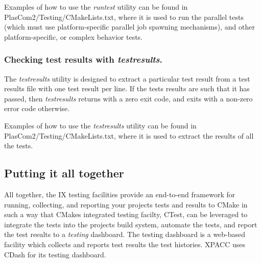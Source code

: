 Examples of how to use the {\itshape runtest} utility can be found in {\ttfamily Plas\+Com2/\+Testing/\+C\+Make\+Lists.\+txt}, where it is used to run the parallel tests (which must use platform-\/specific parallel job spawning mechanisms), and other platform-\/specific, or complex behavior tests.

\subsubsection*{Checking test results with {\itshape testresults}.}

The {\itshape testresults} utility is designed to extract a particular test result from a test results file with one test result per line. If the test\textquotesingle{}s results are such that it has passed, then {\itshape testresults} returns with a zero exit code, and exits with a non-\/zero error code otherwise.

Examples of how to use the {\itshape testresults} utility can be found in {\ttfamily Plas\+Com2/\+Testing/\+C\+Make\+Lists.\+txt}, where it is used to extract the results of all the tests.\hypertarget{testingproject_guide_putting_it_together}{}\subsection{Putting it all together}\label{testingproject_guide_putting_it_together}
All together, the IX testing facilities provide an end-\/to-\/end framework for running, collecting, and reporting your project\textquotesingle{}s tests and results to C\+Make in such a way that C\+Make\textquotesingle{}s integrated testing facilty, C\+Test, can be leveraged to integrate the tests into the project\textquotesingle{}s build system, automate the tests, and report the test results to a {\itshape testing} dashboard. The testing dashboard is a web-\/based facility which collects and reports test results the test histories. X\+P\+A\+CC uses C\+Dash for its testing dashboard.

